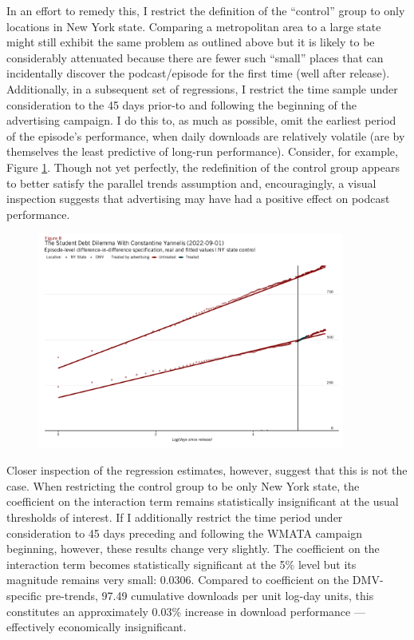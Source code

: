 \documentclass[11pt, letterpaper, twoside]{article}
\begin{document}
In an effort to remedy this, I restrict the definition of the ``control'' group to only locations in New York state. Comparing a metropolitan area to a large state might still exhibit the same problem as outlined above but it is likely to be considerably attenuated because there are fewer such ``small'' places that can incidentally discover the podcast/episode for the first time (well after release). Additionally, in a subsequent set of regressions, I restrict the time sample under consideration to the 45 days prior-to and following the beginning of the advertising campaign. I do this to, as much as possible, omit the earliest period of the episode's performance, when daily downloads are relatively volatile (are by themselves the least predictive of long-run performance). Consider, for example, Figure \ref{fig:yannelis-did-nys}. Though not yet perfectly, the redefinition of the control group appears to better satisfy the parallel trends assumption and, encouragingly, a visual inspection suggests that advertising may have had a positive effect on podcast performance.\\

\begin{figure}[!htb]
  \centering
  \includegraphics[width=0.9\textwidth]{figures/yannelis_did_nys_plot.png}
  \caption{}
  \label{fig:yannelis-did-nys}
\end{figure}

Closer inspection of the regression estimates, however, suggest that this is not the case. When restricting the control group to be only New York state, the coefficient on the interaction term remains statistically insignificant at the usual thresholds of interest. If I additionally restrict the time period under consideration to 45 days preceding and following the WMATA campaign beginning, however, these results change very slightly. The coefficient on the interaction term becomes statistically significant at the 5\% level but its magnitude remains very small: 0.0306. Compared to coefficient on the DMV-specific pre-trends, 97.49 cumulative downloads per unit log-day units, this constitutes an approximately 0.03\% increase in download performance --- effectively economically insignificant.\\
\end{document}
